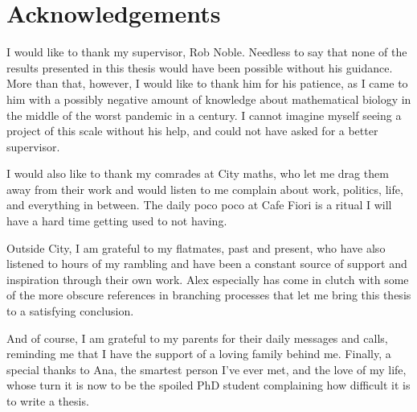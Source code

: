 \chapter*{Acknowledgements}

I would like to thank my supervisor, Rob Noble. Needless to say that none of the
results presented in this thesis would have been possible without his guidance.
More than that, however, I would like to thank him for his patience, as I came
to him with a possibly negative amount of knowledge about mathematical biology
in the middle of the worst pandemic in a century. I cannot imagine myself seeing
a project of this scale without his help, and could not have asked for a better
supervisor.\par
I would also like to thank my comrades at City maths, who let me drag them away
from their work and would listen to me complain about work, politics, life, and
everything in between. The daily poco poco at Cafe Fiori is a ritual I will
have a hard time getting used to not having. \par
Outside City, I am grateful to my flatmates, past and present, who have also
listened to hours of my rambling and have been a constant source of support and
inspiration through their own work. Alex especially has come in clutch with some
of the more obscure references in branching processes that let me bring this
thesis to a satisfying conclusion. \par
And of course, I am grateful to my parents for their daily messages and calls,
reminding me that I have the support of a loving family behind me. Finally, a
special thanks to Ana, the smartest person I've ever met, and the love of my
life, whose turn it is now to be the spoiled PhD student complaining how
difficult it is to write a thesis. \par
